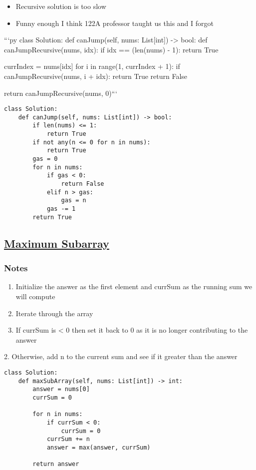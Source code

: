 \documentclass{article}
\begin{document}
\begin{itemize}
\item Recursive solution is too slow
\item Funny enough I think 122A professor taught us this and I forgot
\end{itemize}
```py
class Solution:
    def canJump(self, nums: List[int]) -> bool:
        def canJumpRecursive(nums, idx):
            if idx == (len(nums) - 1):
                return True

            currIndex = nums[idx]
            for i in range(1, currIndex + 1):
                if canJumpRecursive(nums, i + idx):
                    return True
            return False

        return canJumpRecursive(nums, 0)```

\begin{lstlisting}
class Solution:
    def canJump(self, nums: List[int]) -> bool:
        if len(nums) <= 1:
            return True
        if not any(n <= 0 for n in nums):
            return True 
        gas = 0
        for n in nums:
            if gas < 0:
                return False
            elif n > gas:
                gas = n
            gas -= 1
        return True
\end{lstlisting}

\subsection{\href{https://leetcode.com/problems/maximum-subarray/?envType=company&envId=amazon&favoriteSlug=amazon-thirty-days}{Maximum Subarray}}

\subsubsection{Notes }
\begin{enumerate}
\item Initialize the answer as the first element and currSum as the running sum we will compute
\item Iterate through the array
\item If currSum is < 0 then set it back to 0 as it is no longer contributing to the answer
\end{enumerate}
   2. Otherwise, add n to the current sum and see if it greater than the answer   

\begin{lstlisting}
class Solution:
    def maxSubArray(self, nums: List[int]) -> int:
        answer = nums[0]
        currSum = 0

        for n in nums:
            if currSum < 0:
                currSum = 0
            currSum += n
            answer = max(answer, currSum)

        return answer
\end{lstlisting}
\end{document}
